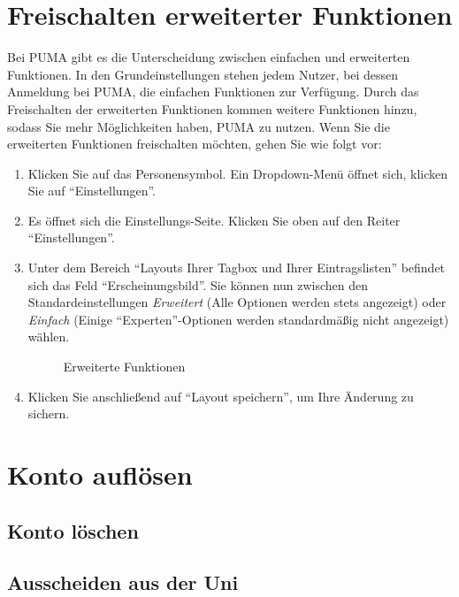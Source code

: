 \section{Freischalten erweiterter Funktionen}
Bei PUMA gibt es die Unterscheidung zwischen einfachen und erweiterten Funktionen. In den Grundeinstellungen stehen jedem Nutzer, bei dessen Anmeldung bei PUMA, die einfachen Funktionen zur Verfügung. Durch das Freischalten der erweiterten Funktionen kommen weitere Funktionen hinzu, sodass Sie mehr Möglichkeiten haben, PUMA zu nutzen.  Wenn Sie die erweiterten Funktionen freischalten möchten, gehen Sie wie folgt vor:
\begin{enumerate}
    \item Klicken Sie auf das Personensymbol. Ein Dropdown-Menü öffnet sich, klicken Sie auf \enquote{Einstellungen}.
    \item Es öffnet sich die Einstellungs-Seite. Klicken Sie oben auf den Reiter \enquote{Einstellungen}.
    \item Unter dem Bereich \enquote{Layouts Ihrer Tagbox und Ihrer Eintragslisten} befindet sich das Feld \enquote{Erscheinungsbild}. Sie können nun zwischen den Standardeinstellungen \textit{Erweitert} (Alle Optionen werden stets angezeigt) oder \textit{Einfach} (Einige \enquote{Experten}-Optionen werden standardmäßig nicht angezeigt) wählen.
    \begin{figure}[h!]
 \centering
 \caption{Erweiterte Funktionen}
 \label{figure024}
\end{figure} 
    \item Klicken Sie anschließend auf \enquote{Layout speichern}, um Ihre Änderung zu sichern.
\end{enumerate}
\section{Konto auflösen} 
\subsection{Konto löschen} \label{kontoauflösen}
\subsection{Ausscheiden aus der Uni} \label{kontolöschen}
